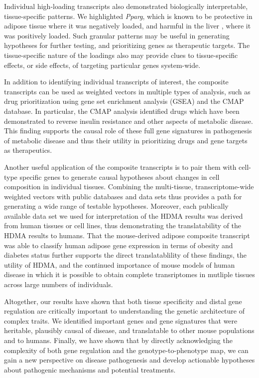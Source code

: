 \documentclass[
]{article}
\begin{document}
Individual high-loading transcripts also demonstrated biologically
interpretable, tissue-specific patterns. We highlighted \textit{Pparg},
which is known to be protective in adipose tissue \cite{pmid17389767}
where it was negatively loaded, and harmful in the liver
\cite{pmid12805374, pmid12618528, 
pmid16357043, pmid15644454, pmid16403437}, where it was positively
loaded. Such granular patterns may be useful in generating hypotheses
for further testing, and prioritizing genes as therapeutic targets. The
tissue-specific nature of the loadings also may provide clues to
tissue-specific effects, or side effects, of targeting particular genes
system-wide.

In addition to identifying individual transcripts of interest, the
composite transcripts can be used as weighted vectors in multiple types
of analysis, such as drug prioritization using gene set enrichment
analysis (GSEA) and the CMAP database. In particular, the CMAP analysis
identified drugs which have been demonstrated to reverse insulin
resistance and other aspects of metabolic disease. This finding supports
the causal role of these full gene signatures in pathogenesis of
metabolic disease and thus their utility in prioritizing drugs and gene
targets as therapeutics.

Another useful application of the composite transcripts is to pair them
with cell-type specific genes to generate causal hypotheses about
changes in cell composition in individual tissues. Combining the
multi-tissue, transcriptome-wide weighted vectors with public databases
and data sets thus provides a path for generating a wide range of
testable hypotheses. Moreover, each publically available data set we
used for interpretation of the HDMA results was derived from human
tissues or cell lines, thus demonstrating the translatability of the
HDMA results to humans. That the mouse-derived adipose composite
transcript was able to classify human adipose gene expression in terms
of obesity and diabetes status further supports the direct
translatablility of these findings, the utility of HDMA, and the
continued importance of mouse models of human disease in which it is
possible to obtain complete transriptomes in mutliple tissues across
large numbers of individuals.

Altogether, our results have shown that both tissue specificity and
distal gene regulation are critically important to understanding the
genetic architecture of complex traits. We identified important genes
and gene signatures that were heritable, plausibly causal of disease,
and translatable to other mouse populations and to humans. Finally, we
have shown that by directly acknowledging the complexity of both gene
regulation and the genotype-to-phenotype map, we can gain a new
perspective on disease pathogenesis and develop actionable hypotheses
about pathogenic mechanisms and potential treatments.
\end{document}
